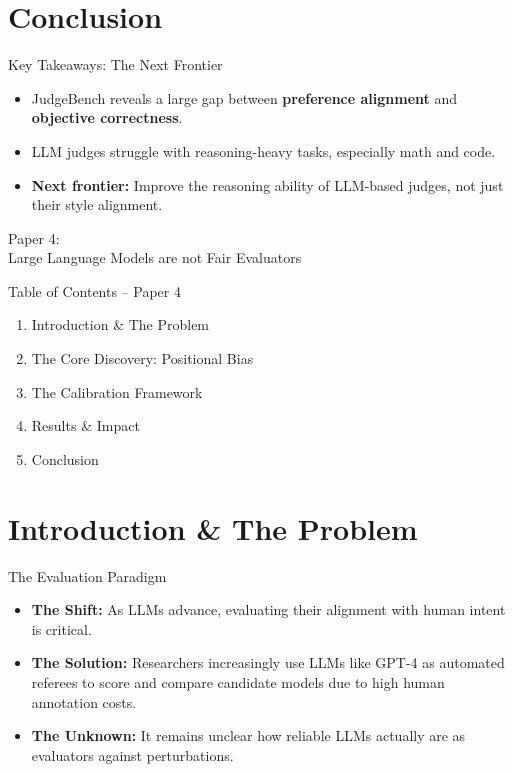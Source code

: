 \documentclass[10pt]{beamer}
\begin{document}
\section{Conclusion}

\begin{frame}{Key Takeaways: The Next Frontier}
  \begin{itemize}
    \item JudgeBench reveals a large gap between \textbf{preference alignment} and \textbf{objective correctness}.
    \item LLM judges struggle with reasoning-heavy tasks, especially math and code.
    \item \textbf{Next frontier:} Improve the reasoning ability of LLM-based judges, not just their style alignment.
  \end{itemize}
\end{frame}


\begin{frame}[standout]
  \hypertarget{paper4}{}
  \Large Paper 4:\\Large Language Models are not Fair Evaluators
\end{frame}

\begin{frame}{Table of Contents -- Paper 4}
  \begin{enumerate}
    \item Introduction \& The Problem
    \item The Core Discovery: Positional Bias
    \item The Calibration Framework
    \item Results \& Impact
    \item Conclusion
  \end{enumerate}
\end{frame}

\section{Introduction \& The Problem}

\begin{frame}{The Evaluation Paradigm}
  \begin{itemize}
    \item \textbf{The Shift:} As LLMs advance, evaluating their alignment with human intent is critical.
    \item \textbf{The Solution:} Researchers increasingly use LLMs like GPT-4 as automated referees to score and compare candidate models due to high human annotation costs.
    \item \textbf{The Unknown:} It remains unclear how reliable LLMs actually are as evaluators against perturbations.
  \end{itemize}
\end{frame}
\end{document}
